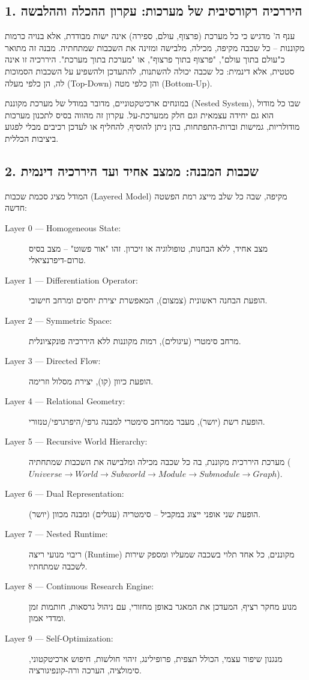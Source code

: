 \documentclass{article}
\begin{document}
\subsection{1. היררכיה רקורסיבית של מערכות: עקרון ההכלה וההלבשה}
ענף ה' מדגיש כי כל מערכת (פרצוף, עולם, ספירה) אינה ישות מבודדת, אלא בנויה כרמות מקוננות – כל שכבה מקיפה, מכילה, מלבישה ומזינה את השכבות שמתחתיה. מבנה זה מתואר כ"עולם בתוך עולם", "פרצוף בתוך פרצוף", או "מערכת בתוך מערכת". היררכיה זו אינה סטטית, אלא דינמית: כל שכבה יכולה להשתנות, להתעדכן ולהשפיע על השכבות הסמוכות לה, הן כלפי מעלה (Top-Down) והן כלפי מטה (Bottom-Up).

במונחים ארכיטקטוניים, מדובר במודל של מערכת מקוננת (Nested System), שבו כל מודול הוא גם יחידה עצמאית וגם חלק ממערכת-על. עקרון זה מהווה בסיס לתכנון מערכות מודולריות, גמישות וברות-התפתחות, בהן ניתן להוסיף, להחליף או לעדכן רכיבים מבלי לפגוע ביציבות הכללית.

\subsection{2. שכבות המבנה: ממצב אחיד ועד היררכיה דינמית}
המודל מציג סכמת שכבות (Layered Model) מקיפה, שבה כל שלב מייצג רמת הפשטה חדשה:
\begin{description}
    \item[Layer 0 — Homogeneous State:] מצב אחיד, ללא הבחנות, טופולוגיה או זיכרון. זהו "אור פשוט" – מצב בסיס טרום-דיפרנציאלי.
    \item[Layer 1 — Differentiation Operator:] הופעת הבחנה ראשונית (צמצום), המאפשרת יצירת יחסים ומרחב חישובי.
    \item[Layer 2 — Symmetric Space:] מרחב סימטרי (עיגולים), רמות מקוננות ללא היררכיה פונקציונלית.
    \item[Layer 3 — Directed Flow:] הופעת כיוון (קו), יצירת מסלול וזרימה.
    \item[Layer 4 — Relational Geometry:] הופעת רשת (יושר), מעבר ממרחב סימטרי למבנה גרפי/היפרגרפי/טנזורי.
    \item[Layer 5 — Recursive World Hierarchy:] מערכת היררכית מקוננת, בה כל שכבה מכילה ומלבישה את השכבות שמתחתיה ($Universe \rightarrow World \rightarrow Subworld \rightarrow Module \rightarrow Submodule \rightarrow Graph$).
    \item[Layer 6 — Dual Representation:] הופעת שני אופני ייצוג במקביל – סימטריה (עגולים) ומבנה מכוון (יושר).
    \item[Layer 7 — Nested Runtime:] ריבוי מנועי ריצה (Runtime) מקוננים, כל אחד תלוי בשכבה שמעליו ומספק שירות לשכבה שמתחתיו.
    \item[Layer 8 — Continuous Research Engine:] מנוע מחקר רציף, המעדכן את המאגר באופן מחזורי, עם ניהול גרסאות, חותמות זמן ומדדי אמון.
    \item[Layer 9 — Self-Optimization:] מנגנון שיפור עצמי, הכולל תצפית, פרופילינג, זיהוי חולשות, חיפוש ארכיטקטוני, סימולציה, הערכה ורה-קונפיגורציה.
\end{description}
\end{document}
